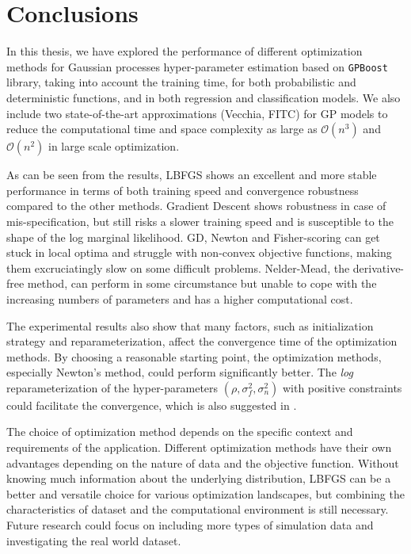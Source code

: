 \chapter{Conclusions}
\label{s:Conclusions}

In this thesis, we have explored the performance of different optimization methods for Gaussian processes hyper-parameter estimation based on \texttt{GPBoost} library, taking into account the training time, for both probabilistic and deterministic functions, and in both regression and classification models. We also include two state-of-the-art approximations (Vecchia, FITC) for GP models to reduce the computational time and space complexity as large as $\mathcal{O}(n^3)$ and $\mathcal{O}(n^2)$ in large scale optimization.

As can be seen from the results, LBFGS shows an excellent and more stable performance in terms of both training speed and convergence robustness compared to the other methods. Gradient Descent shows robustness in case of mis-specification, but still risks a slower training speed and is susceptible to the shape of the log marginal likelihood. GD, Newton and Fisher-scoring can get stuck in local optima and struggle with non-convex objective functions, making them excruciatingly slow on some difficult problems. Nelder-Mead, the derivative-free method, can perform in some circumstance but unable to cope with the increasing numbers of parameters and has a higher computational cost. 

The experimental results also show that many factors, such as initialization strategy and reparameterization, affect the convergence time of the optimization methods. By choosing a reasonable starting point, the optimization methods, especially Newton's method, could perform significantly better. The \textit{log} reparameterization of the hyper-parameters $(\rho, \sigma^2_f, \sigma^2_n)$ with positive constraints could facilitate the convergence, which is also suggested in \cite{basak2021numerical}.

The choice of optimization method depends on the specific context and requirements of the application. Different optimization methods have their own advantages depending on the nature of data and the objective function. Without knowing much information about the underlying distribution, LBFGS can be a better and versatile choice for various optimization landscapes, but combining the characteristics of dataset and the computational environment is still necessary. Future research could focus on including more types of simulation data and investigating the real world dataset.





